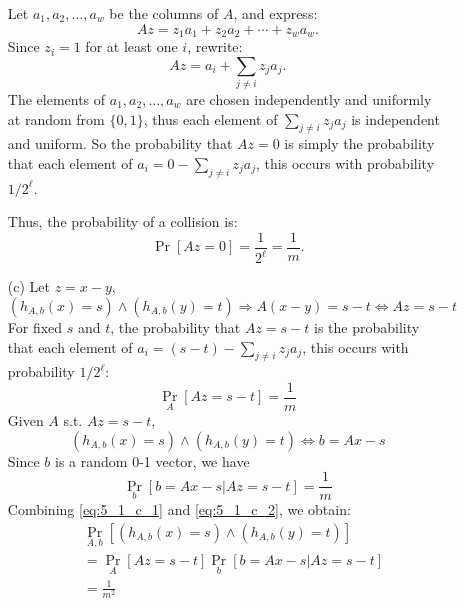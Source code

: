 \documentclass[11pt]{article}
\begin{document}
\begin{description}
\begin{enumerate}
    Let $ a_1, a_2, \dots, a_w $ be the columns of $ A $, and express:
    \begin{equation}
      A z = z_1 a_1 + z_2 a_2 + \cdots + z_w a_w.
    \end{equation}
    Since $ z_i = 1 $ for at least one $ i $, rewrite:
    \begin{equation}
      A z = a_i + \sum_{j \neq i} z_j a_j.
    \end{equation}
    The elements of $ a_1, a_2, \dots, a_w $ are chosen independently 
    and uniformly at random from $ \{0,1\} $,
    thus each element of $\sum_{j \neq i} z_j a_j$ is independent and uniform.
    So the probability that $ A z = 0 $ is simply 
    the probability that each element of $ a_i = 0 - \sum_{j \neq i} z_j a_j$,
    this occurs with probability $ 1/2^\ell $.

    Thus, the probability of a collision is:
    \begin{equation}
      \Pr[A z = 0] = \frac{1}{2^\ell} = \frac{1}{m}.
    \end{equation}

  \item[(c)]
  Let $z = x-y$,
  \begin{equation}
    (h_{A,b}(x)=s) \wedge (h_{A,b}(y)=t)  \Rightarrow
    A(x-y) = s-t \Leftrightarrow
    Az = s-t
  \end{equation}
  For fixed $s$ and $t$, the probability that $ Az = s-t $ is 
  the probability that each element of $ a_i = (s-t) - \sum_{j \neq i} z_j a_j$, 
  this occurs with probability $1/2^\ell$:
  \begin{equation}
    \Pr_A[Az=s-t] = \frac{1}{m}
    \label{eq:5_1_c_1}
  \end{equation}
  Given $A$ s.t. $ Az = s-t $, 
  \begin{equation}
    (h_{A,b}(x)=s) \wedge (h_{A,b}(y)=t)  \Leftrightarrow
    b = Ax-s
  \end{equation}
  Since $b$ is a random 0-1 vector, we have
  \begin{equation}
    \Pr_b[b=Ax-s|Az=s-t] = \frac{1}{m}
    \label{eq:5_1_c_2}
  \end{equation}
  Combining \ref{eq:5_1_c_1} and \ref{eq:5_1_c_2}, we obtain:
  \begin{align}
    &\Pr_{A,b}[(h_{A,b}(x)=s) \wedge (h_{A,b}(y)=t)] \nonumber \\
    &= \Pr_A[Az=s-t] \Pr_b[b=Ax-s|Az=s-t] \nonumber \\
    &= \frac{1}{m^2}
  \end{align}
\end{enumerate}



\end{description}
\end{document}
